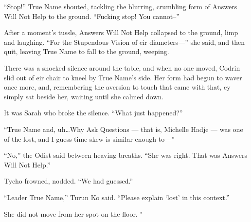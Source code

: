 ``Stop!'' True Name shouted, tackling the blurring, crumbling form of Answers Will Not Help to the ground. ``Fucking stop! You cannot--''

After a moment's tussle, Answers Will Not Help collapsed to the ground, limp and laughing. ``For the Stupendous Vision of eir diameters—'' she said, and then quit, leaving True Name to fall to the ground, weeping.

There was a shocked silence around the table, and when no one moved, Codrin slid out of eir chair to kneel by True Name's side. Her form had begun to waver once more, and, remembering the aversion to touch that came with that, ey simply sat beside her, waiting until she calmed down.

It was Sarah who broke the silence. ``What just happened?''

``True Name and, uh\ldots Why Ask Questions — that is, Michelle Hadje — was one of the lost, and I guess time skew is similar enough to—''

``No,'' the Odist said between heaving breaths. ``She was right. That was Answers Will Not Help.''

Tycho frowned, nodded. ``We had guessed.''

``Leader True Name,'' Turun Ko said. ``Please explain `lost' in this context.''

She did not move from her spot on the floor. "
